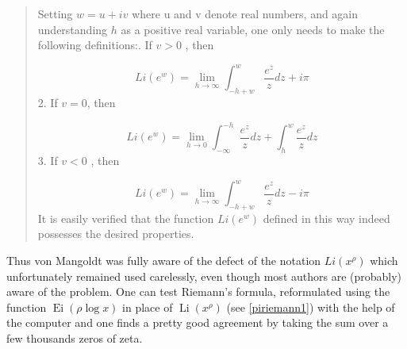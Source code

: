 \documentclass{article}
\begin{document}
    \begin{small}
\begin{quote}Setting
$
w = u + iv
$
where  u  and  v  denote real numbers, and again understanding $h$  as a positive real variable, one only needs to make the following definitions:.	If  $v > 0$ , then

$$
L i\left(e^w\right) = \lim_{h \to \infty} \int_{-h+w}^w \frac{e^z}{z} dz + i\pi
$$
	2.	If  $v = 0$, then

$$
L i\left(e^w\right) = \lim_{h \to 0}\int_{-\infty}^{-h} \frac{e^z}{z} dz + \int_h^w \frac{e^z}{z} dz
$$
	3.	If  $v < 0$ , then

$$
L i\left(e^w\right) = \lim_{h \to \infty} \int_{-h+w}^w \frac{e^z}{z} dz - i\pi
$$
It is easily verified that the function  $L i\left(e^w\right)$ defined in this way indeed possesses the desired properties.\end{quote} 
\end{small}
Thus von Mangoldt was fully aware of the defect of the notation $Li(x^\rho)$ which unfortunately remained used carelessly, even though most authors are (probably) aware of the problem. \newline
One can test Riemann's formula, reformulated   using the function $\operatorname{Ei}(\rho\log x)$ in place of $\operatorname{Li}(x^\rho)$ (see \eqref{piriemann1}) with the help of the computer and one finds a pretty good agreement by taking the sum over a few thousands zeros of zeta.
\end{document}
